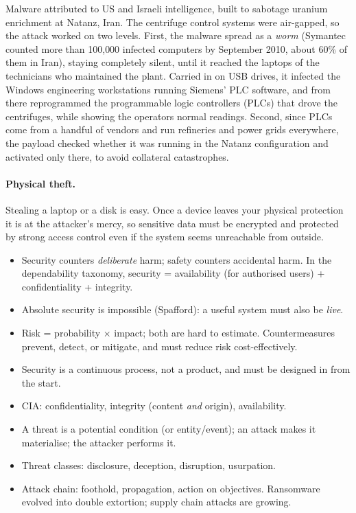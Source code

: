 \begin{example}[Stuxnet]
Malware attributed to US and Israeli intelligence, built to sabotage uranium enrichment at Natanz, Iran. The centrifuge control systems were air-gapped, so the attack worked on two levels. First, the malware spread as a \emph{worm} (Symantec counted more than 100{,}000 infected computers by September 2010, about 60\% of them in Iran), staying completely silent, until it reached the laptops of the technicians who maintained the plant. Carried in on USB drives, it infected the Windows engineering workstations running Siemens' PLC software, and from there reprogrammed the programmable logic controllers (PLCs) that drove the centrifuges, while showing the operators normal readings. Second, since PLCs come from a handful of vendors and run refineries and power grids everywhere, the payload checked whether it was running in the Natanz configuration and activated only there, to avoid collateral catastrophes.
\end{example}

\paragraph{Physical theft.} Stealing a laptop or a disk is easy. Once a device leaves your physical protection it is at the attacker's mercy, so sensitive data must be encrypted and protected by strong access control even if the system seems unreachable from outside.

\begin{summary}
\begin{itemize}
    \item Security counters \emph{deliberate} harm; safety counters accidental harm. In the dependability taxonomy, security = availability (for authorised users) + confidentiality + integrity.
    \item Absolute security is impossible (Spafford): a useful system must also be \emph{live}.
    \item Risk = probability $\times$ impact; both are hard to estimate. Countermeasures prevent, detect, or mitigate, and must reduce risk cost-effectively.
    \item Security is a continuous process, not a product, and must be designed in from the start.
    \item CIA: confidentiality, integrity (content \emph{and} origin), availability.
    \item A threat is a potential condition (or entity/event); an attack makes it materialise; the attacker performs it.
    \item Threat classes: disclosure, deception, disruption, usurpation.
    \item Attack chain: foothold, propagation, action on objectives. Ransomware evolved into double extortion; supply chain attacks are growing.
\end{itemize}
\end{summary}

